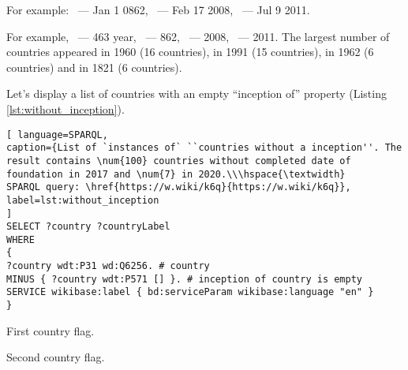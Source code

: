 For example: ~--- Jan 1 0862, ~--- Feb 17 2008, ~--- Jul 9 2011.

For example, ~--- 463 year, ~--- 862, ~--- 2008, ~--- 2011.
The largest number of countries appeared in 1960 (16 countries), in 1991 (15 countries), in 1962 (6 countries) and in 1821 (6 countries).

Let's display a list of countries with an empty ``inception of'' property (Listing \ref{lst:without_inception}).

\begin{lstlisting}[ language=SPARQL, 
caption={List of `instances of` ``countries without a inception''. The result contains \num{100} countries without completed date of foundation in 2017 and \num{7} in 2020.\\\hspace{\textwidth}
SPARQL query: \href{https://w.wiki/k6q}{https://w.wiki/k6q}},
label=lst:without_inception
]
SELECT ?country ?countryLabel 
WHERE
{
?country wdt:P31 wd:Q6256. # country
MINUS { ?country wdt:P571 [] }. # inception of country is empty
SERVICE wikibase:label { bd:serviceParam wikibase:language "en" }
}
\end{lstlisting}



\begin{marginfigure}[0.0cm]
	{
		\setlength{\fboxsep}{0pt}%
		\setlength{\fboxrule}{1pt}%
	}
	\caption{First country flag.}%
	\label{fig:flag_kor}%
\end{marginfigure}

\begin{marginfigure}[4.0cm]
	{
		\setlength{\fboxsep}{0pt}%
		\setlength{\fboxrule}{1pt}%
	}
	\caption{Second country flag.}%
	\label{fig:flag_mongolia}%
\end{marginfigure}




